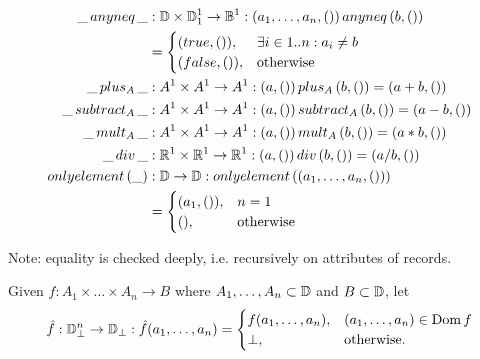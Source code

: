 \begin{defbox}
\begin{align*}
\sanyneq{\_}{\_} &: \sdom \times \ssingledom^1 \to \sboolean^1 : \sanyneq{(a_1, \dots, a_n, ())}{(b, ())} \\
&= \begin{cases}
(true, ()), & \exists i \in 1..n : a_i \neq b \\
(false, ()), & \text{otherwise}
\end{cases} \\
\splus{A}{\_}{\_} &: A^1 \times A^1 \to A^1 : \splus{A}{(a, ())}{(b, ())} = (a + b, ()) \\
\ssubt{A}{\_}{\_} &: A^1 \times A^1 \to A^1 : \ssubt{A}{(a, ())}{(b, ())} = (a - b, ()) \\
\smult{A}{\_}{\_} &: A^1 \times A^1 \to A^1 : \smult{A}{(a, ())}{(b, ())} = (a * b, ()) \\
\sdiv{\_}{\_} &: \snumber^1 \times \snumber^1 \to \snumber^1 : \sdiv{(a, ())}{(b, ())} = (a / b, ()) \\
\sonlyelement{\_} &: \sdom \to \sdom : \sonlyelement{(a_1, \dots, a_n, ())} \\
&= \begin{cases}
(a_1, ()), & n = 1 \\
(), & \text{otherwise}
\end{cases}
\end{align*}

Note: equality is checked deeply, i.e. recursively on attributes of records.


Given $f : A_1 \times \dots \times A_n \to B$ where $A_1, \dots, A_n \subset \sdom$ and $B \subset \sdom$, let
\begin{equation*}
\hat{f} : \sdom_\bot^n \to \sdom_\bot : \hat{f}(a_1, \dots, a_n) =
\begin{cases}
f(a_1, \dots, a_n), & (a_1, \dots, a_n) \in \dom{f} \\
\bot, & \text{otherwise.}
\end{cases}
\end{equation*}
\end{defbox}
